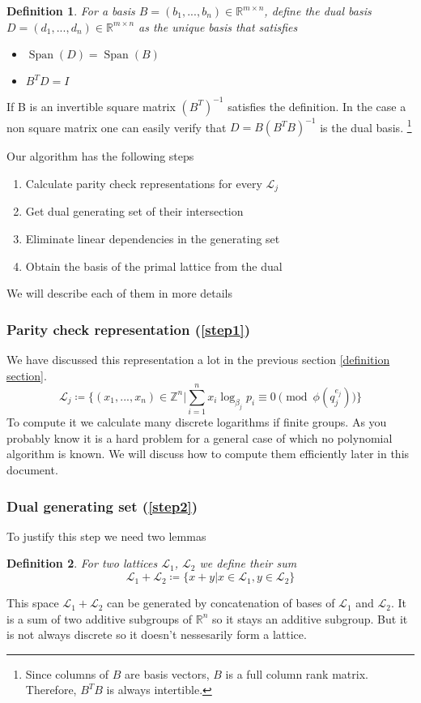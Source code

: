 \documentclass[12pt]{article}
\newcommand{\ZZ}{\mathbb{Z}}
\newcommand{\LL}{\mathcal{L}}
\DeclareMathOperator{\Span}{Span}
\newtheorem{definition}{Definition}
\begin{document}
\begin{definition}
    For a basis $B = (b_{1}, ..., b_{n}) \in \mathbb{R}^{m \times n}$, define the dual basis $D = (d_{1}, ..., d_{n}) \in \mathbb{R}^{m \times n}$ as the unique basis that satisfies
    \begin{itemize}
        \item $\Span(D) = \Span(B)$
        \item $B^{T}D = I$
    \end{itemize}
\end{definition}
If B is an invertible square matrix $(B^{T})^{-1}$ satisfies the definition. In the case a non square matrix one can easily verify that $D = B(B^{T}B)^{-1}$ is the dual basis. \footnote{Since columns of $B$ are basis vectors, $B$ is a full column rank matrix. Therefore, $B^{T}B$ is always intertible.}


 Our algorithm \label{algorithm} has the following steps
\begin{enumerate}
    \item \label{step1} Calculate parity check representations for every $\LL_{j}$
    \item \label{step2} Get dual generating set of their intersection
    \item \label{step3} Eliminate linear dependencies in the generating set
    \item \label{step4} Obtain the basis of the primal lattice from the dual
\end{enumerate}
We will describe each of them in more details

\subsubsection{Parity check representation (\ref{step1})}
We have discussed this representation a lot in the previous section \ref{definition section}.
\[
    \LL_{j} \coloneqq \{(x_{1}, ..., x_{n}) \in \ZZ^{n} | \sum_{i=1}^{n}x_{i}\log_{\beta_{j}}p_{i}\equiv 0 \pmod{\phi(q_{j}^{e_{j}})}\}
\]
To compute it we calculate many discrete logarithms if finite groups. As you probably know it is a hard problem for a general case of which no polynomial algorithm is known. We will discuss how to compute them efficiently later in this document.

\subsubsection{Dual generating set (\ref{step2})}
To justify this step we need two lemmas
\begin{definition}
    For two lattices $\LL_1$, $\LL_2$ we define their sum
\[
    \LL_1 + \LL_2 \coloneqq \{x + y | x \in \LL_1, y \in \LL_2\}
\]
\end{definition}
This space $\LL_{1} + \LL_{2}$ can be generated by concatenation of bases of $\LL_{1}$ and $\LL_{2}$. It is a sum of two additive subgroups of $\mathbb{R}^{n}$ so it stays an additive subgroup. But it is not always discrete so it doesn't nessesarily form a lattice.
\end{document}
